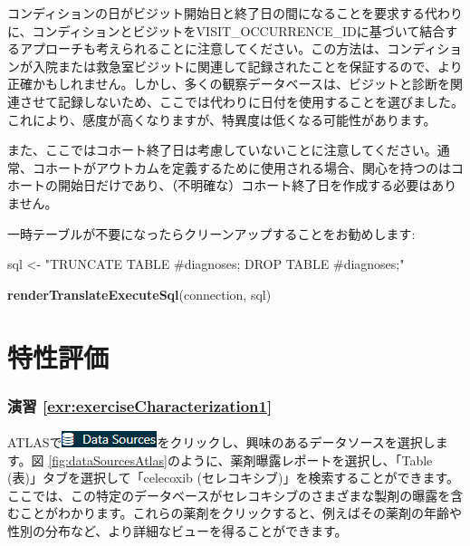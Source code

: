 \documentclass[
  11pt]{book}
\newenvironment{Shaded}{\begin{snugshade}}{\end{snugshade}}
\newcommand{\FunctionTok}[1]{\textcolor[rgb]{0.13,0.29,0.53}{\textbf{#1}}}
\newcommand{\NormalTok}[1]{#1}
\newcommand{\OtherTok}[1]{\textcolor[rgb]{0.56,0.35,0.01}{#1}}
\newcommand{\StringTok}[1]{\textcolor[rgb]{0.31,0.60,0.02}{#1}}
\theoremstyle{definition}
\theoremstyle{definition}
\theoremstyle{definition}
\theoremstyle{definition}
\theoremstyle{remark}
\begin{document}
コンディションの日がビジット開始日と終了日の間になることを要求する代わりに、コンディションとビジットをVISIT\_OCCURRENCE\_IDに基づいて結合するアプローチも考えられることに注意してください。この方法は、コンディションが入院または救急室ビジットに関連して記録されたことを保証するので、より正確かもしれません。しかし、多くの観察データベースは、ビジットと診断を関連させて記録しないため、ここでは代わりに日付を使用することを選びました。これにより、感度が高くなりますが、特異度は低くなる可能性があります。

また、ここではコホート終了日は考慮していないことに注意してください。通常、コホートがアウトカムを定義するために使用される場合、関心を持つのはコホートの開始日だけであり、（不明確な）コホート終了日を作成する必要はありません。

一時テーブルが不要になったらクリーンアップすることをお勧めします:

\begin{Shaded}
\begin{Highlighting}[]
\NormalTok{sql }\OtherTok{\textless{}{-}} \StringTok{"TRUNCATE TABLE \#diagnoses;}
\StringTok{DROP TABLE \#diagnoses;"}

\FunctionTok{renderTranslateExecuteSql}\NormalTok{(connection, sql)}
\end{Highlighting}
\end{Shaded}

\section{特性評価}\label{Characterizationanswers}

\subsubsection*{演習 \ref{exr:exerciseCharacterization1}}\label{ux6f14ux7fd2-refexrexercisecharacterization1}

ATLASで\includegraphics{images/Characterization/atlasDataSourcesMenuItem.png}をクリックし、興味のあるデータソースを選択します。図 \ref{fig:dataSourcesAtlas}のように、薬剤曝露レポートを選択し、「Table (表)」タブを選択して「celecoxib (セレコキシブ)」を検索することができます。ここでは、この特定のデータベースがセレコキシブのさまざまな製剤の曝露を含むことがわかります。これらの薬剤をクリックすると、例えばその薬剤の年齢や性別の分布など、より詳細なビューを得ることができます。
\end{document}
